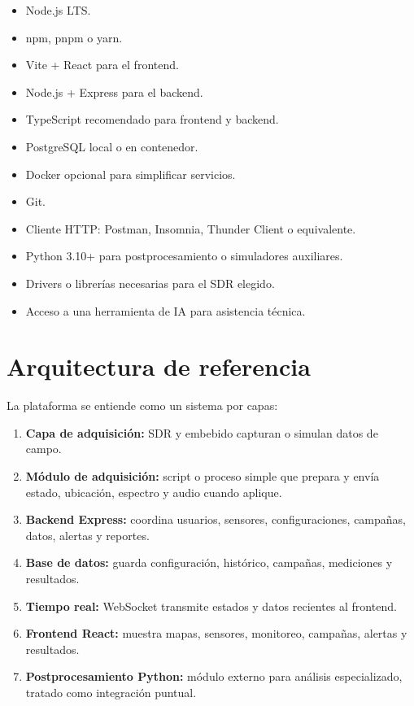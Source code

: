 \documentclass[11pt,a4paper]{article}
\begin{document}
\begin{itemize}
  \item Node.js LTS.
  \item npm, pnpm o yarn.
  \item Vite + React para el frontend.
  \item Node.js + Express para el backend.
  \item TypeScript recomendado para frontend y backend.
  \item PostgreSQL local o en contenedor.
  \item Docker opcional para simplificar servicios.
  \item Git.
  \item Cliente HTTP: Postman, Insomnia, Thunder Client o equivalente.
  \item Python 3.10+ para postprocesamiento o simuladores auxiliares.
  \item Drivers o librerías necesarias para el SDR elegido.
  \item Acceso a una herramienta de IA para asistencia técnica.
\end{itemize}

\section*{Arquitectura de referencia}

La plataforma se entiende como un sistema por capas:

\begin{enumerate}
  \item \textbf{Capa de adquisición:} SDR y embebido capturan o simulan datos de campo.
  \item \textbf{Módulo de adquisición:} script o proceso simple que prepara y envía estado, ubicación, espectro y audio cuando aplique.
  \item \textbf{Backend Express:} coordina usuarios, sensores, configuraciones, campañas, datos, alertas y reportes.
  \item \textbf{Base de datos:} guarda configuración, histórico, campañas, mediciones y resultados.
  \item \textbf{Tiempo real:} WebSocket transmite estados y datos recientes al frontend.
  \item \textbf{Frontend React:} muestra mapas, sensores, monitoreo, campañas, alertas y resultados.
  \item \textbf{Postprocesamiento Python:} módulo externo para análisis especializado, tratado como integración puntual.
\end{enumerate}
\end{document}
